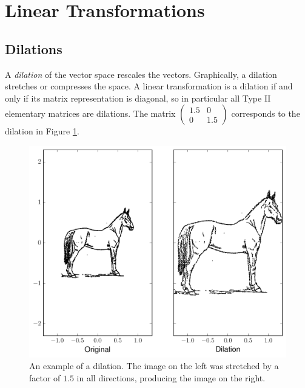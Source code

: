 
\section*{Linear Transformations} %


\subsection*{Dilations}
A \emph{dilation} of the vector space rescales the vectors. 
Graphically, a dilation stretches or compresses the space. 
A linear transformation is a dilation if and only if its matrix representation is diagonal, so in particular all Type II elementary matrices are dilations. 
The matrix $\begin{pmatrix}
1.5 & 0\\
0 & 1.5 \end{pmatrix}$ corresponds to the dilation in Figure \ref{fig:dilation}.
\begin{figure}
\includegraphics[width=\textwidth]{stretch.pdf}
\caption{An example of a dilation. 
The image on the left was stretched by a factor of $1.5$ in all directions, producing the image on the right.}
\label{fig:dilation}
\end{figure}

